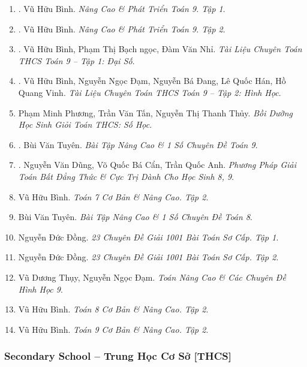 \documentclass{article}
\begin{document}
\begin{enumerate}
	\item \cite{Binh_Toan_9_tap_1}. Vũ Hữu Bình. \textit{Nâng Cao \& Phát Triển Toán 9. Tập 1}.\hfill{}
	\item \cite{Binh_Toan_9_tap_2}. Vũ Hữu Bình. \textit{Nâng Cao \& Phát Triển Toán 9. Tập 2}.\hfill{}
	\item \cite{TLCT_THCS_Toan_9_dai_so}. Vũ Hữu Bình, Phạm Thị Bạch ngọc, Đàm Văn Nhỉ. \textit{Tài Liệu Chuyên Toán THCS Toán 9 -- Tập 1: Đại Số}.\\\mbox{}\hfill{}
	\item \cite{TLCT_THCS_Toan_9_hinh_hoc}. Vũ Hữu Bình, Nguyễn Ngọc Đạm, Nguyễn Bá Đang, Lê Quốc Hán, Hồ Quang Vinh. \textit{Tài Liệu Chuyên Toán THCS Toán 9 -- Tập 2: Hình Học}.\hfill{}
	\item Phạm Minh Phương, Trần Văn Tấn, Nguyễn Thị Thanh Thủy. \textit{Bồi Dưỡng Học Sinh Giỏi Toán THCS: Số Học}.
	\item \cite{Tuyen_Toan_9}. Bùi Văn Tuyên. \textit{Bài Tập Nâng Cao \& 1 Số Chuyên Đề Toán 9}.\hfill{}
	\item \cite{Dung_Can_Anh_BDT_8_9}. Nguyễn Văn Dũng, Võ Quốc Bá Cẩn, Trần Quốc Anh. \textit{Phương Pháp Giải Toán Bất Đẳng Thức \& Cực Trị Dành Cho Học Sinh 8, 9}.\hfill{\sf[bought]}
	
	\item Vũ Hữu Bình. \textit{Toán 7 Cơ Bản \& Nâng Cao. Tập 2}.
	\item Bùi Văn Tuyên. \textit{Bài Tập Nâng Cao \& 1 Số Chuyên Đề Toán 8}.
	\item Nguyễn Đức Đồng. \textit{23 Chuyên Đề Giải 1001 Bài Toán Sơ Cấp. Tập 1}.\hfill{\sf[bought]}
	\item Nguyễn Đức Đồng. \textit{23 Chuyên Đề Giải 1001 Bài Toán Sơ Cấp. Tập 2}.\hfill{\sf[bought]}
	\item Vũ Dương Thụy, Nguyễn Ngọc Đạm. \textit{Toán Nâng Cao \& Các Chuyên Đề Hình Học 9}.
	\item Vũ Hữu Bình. \textit{Toán 8 Cơ Bản \& Nâng Cao. Tập 2}.
	\item Vũ Hữu Bình. \textit{Toán 9 Cơ Bản \& Nâng Cao. Tập 2}.
\end{enumerate}

\subsubsection{Secondary School -- Trung Học Cơ Sở [THCS]}
\end{document}
